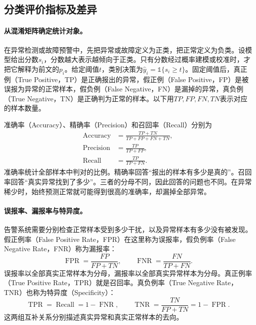 \subsection{分类评价指标及差异}
\paragraph{从混淆矩阵确定统计对象。}
在异常检测或故障预警中，先把异常或故障定义为正类，把正常定义为负类。设模型给出分数$s_i$，分数越大表示越倾向于正类。只有分数经过概率建模或校准时，才把它解释为前文的$p_i$。给定阈值$t$，类别决策为$\hat y_i=\mathbb 1\{s_i\geq t\}$。固定阈值后，真正例（True Positive，TP）是正确报出的异常，假正例（False Positive，FP）是被误报为异常的正常样本，假负例（False Negative，FN）是漏掉的异常，真负例（True Negative，TN）是正确判为正常的样本。以下用$TP,FP,FN,TN$表示对应的样本数量。

准确率（Accuracy）、精确率（Precision）和召回率（Recall）分别为
\begin{align}
 \operatorname{Accuracy}&=\frac{TP+TN}{TP+FP+FN+TN},\\
 \operatorname{Precision}&=\frac{TP}{TP+FP},\\
 \operatorname{Recall}&=\frac{TP}{TP+FN}.
 \label{eq:classification-basic-metrics}
\end{align}
准确率统计全部样本中判对的比例。精确率回答“报出的样本有多少是真的”。召回率回答“真实异常找到了多少”。三者的分母不同，因此回答的问题也不同。在异常稀少时，始终预测正常就可能得到很高的准确率，却漏掉全部异常。

\paragraph{误报率、漏报率与特异度。}
告警系统需要分别检查正常样本受到多少干扰，以及异常样本有多少没有被发现。假正例率（False Positive Rate，FPR）在这里称为误报率，假负例率（False Negative Rate，FNR）称为漏报率：
\begin{equation}
 \operatorname{FPR}=\frac{FP}{FP+TN},\qquad
 \operatorname{FNR}=\frac{FN}{TP+FN}.
 \label{eq:classification-fpr-fnr}
\end{equation}
误报率以全部真实正常样本为分母，漏报率以全部真实异常样本为分母。真正例率（True Positive Rate，TPR）就是召回率。真负例率（True Negative Rate，TNR）也称为特异度（Specificity）：
\begin{equation}
 \operatorname{TPR}=\operatorname{Recall}=1-\operatorname{FNR},\qquad
 \operatorname{TNR}=\frac{TN}{FP+TN}=1-\operatorname{FPR}.
 \label{eq:classification-tpr-tnr}
\end{equation}
这两组互补关系分别描述真实异常和真实正常样本的去向。

